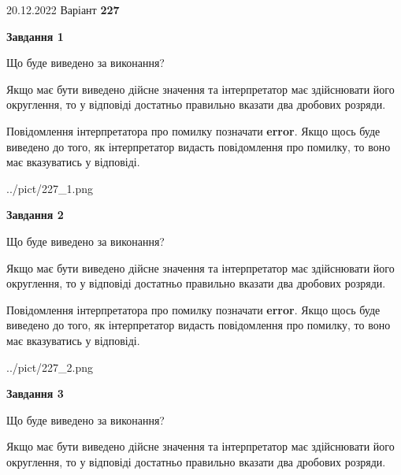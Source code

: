 \documentclass[12pt, ukrainian]{article}
\begin{document}
{20.12.2022 Варіант \No \textbf { 227 }\par}
{
\begin {Large}

{\begin {center}\textbf{Завдання 1}\end {center}}\par
Що буде виведено за виконання? \par

Якщо має бути виведено дійсне значення та інтерпретатор має здійснювати його округлення, 
то у відповіді достатньо правильно вказати два дробових розряди.

Повідомлення інтерпретатора про помилку позначати \textbf{error}.
Якщо щось буде виведено до того, як інтерпретатор видасть повідомлення про помилку, 
то воно має вказуватись у відповіді. \par

\begin{center}
	{../pict/227_1.png}
\end{center}
\newpage

{\begin {center}\textbf{Завдання 2}\end {center}}\par
Що буде виведено за виконання? \par

Якщо має бути виведено дійсне значення та інтерпретатор має здійснювати його округлення, 
то у відповіді достатньо правильно вказати два дробових розряди.

Повідомлення інтерпретатора про помилку позначати \textbf{error}.
Якщо щось буде виведено до того, як інтерпретатор видасть повідомлення про помилку, 
то воно має вказуватись у відповіді. \par

\begin{center}
	{../pict/227_2.png}
\end{center}
\newpage

{\begin {center}\textbf{Завдання 3}\end {center}}\par
Що буде виведено за виконання? \par

Якщо має бути виведено дійсне значення та інтерпретатор має здійснювати його округлення, 
то у відповіді достатньо правильно вказати два дробових розряди.


\end{Large}}
\end{document}
